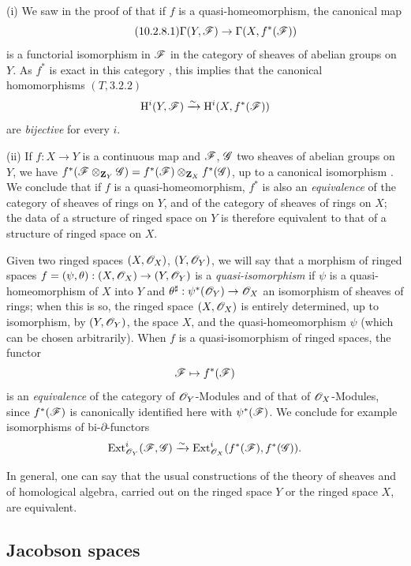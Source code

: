 \begin{remarks}[10.2.8]
\label{IV.10.2.8}
(i) We saw in the proof of  that if $f$ is a quasi-homeomorphism, the canonical map
\begin{equation}
\label{IV.10.2.8.1}
\tag{10.2.8.1}
\Gamma(Y,\mathscr{F})\to\Gamma(X,f^*(\mathscr{F}))
\end{equation}
is a functorial isomorphism in $\mathscr{F}$ in the category of sheaves of abelian groups on $Y$.
As $f^*$ is exact in this category , this implies that the canonical homomorphisms $(T,3.2.2)$
\[
  \mathrm{H}^i(Y,\mathscr{F})\xrightarrow{\sim}\mathrm{H}^i(X,f^*(\mathscr{F}))
\]
are \emph{bijective} for every $i$.

(ii) If $f:X\to Y$ is a continuous map and $\mathscr{F}$, $\mathscr{G}$ two sheaves of abelian groups on $Y$, we have $f^*(\mathscr{F}\otimes_{\mathbf{Z}_Y}\mathscr{G})=f^*(\mathscr{F})\otimes_{\mathbf{Z}_X}f^*(\mathscr{G})$, up to a canonical isomorphism .
We conclude that if $f$ is a quasi-homeomorphism, $f^*$ is also an \emph{equivalence} of the category of sheaves of rings on $Y$, and of the category of sheaves of rings on $X$; the data of a structure of ringed space on $Y$ is therefore equivalent to that of a structure of ringed space on $X$.

Given two ringed spaces $(X,\mathscr{O}_X)$, $(Y,\mathscr{O}_Y)$, we will say that a morphism of ringed spaces $f=(\psi,\theta):(X,\mathscr{O}_X)\to(Y,\mathscr{O}_Y)$ is a \emph{quasi-isomorphism} if $\psi$ is a quasi-homeomorphism of $X$ into $Y$ and $\theta^\sharp:\psi^*(\mathscr{O}_Y)\to\mathscr{O}_X$ an isomorphism of sheaves of rings; when this is so, the ringed space $(X,\mathscr{O}_X)$ is entirely determined, up to isomorphism, by $(Y,\mathscr{O}_Y)$, the space $X$, and the quasi-homeomorphism $\psi$ (which can be chosen arbitrarily).
When $f$ is a quasi-isomorphism of ringed spaces, the functor
\[
  \mathscr{F}\mapsto f^*(\mathscr{F})
\]
is an \emph{equivalence} of the category of $\mathscr{O}_Y$-Modules and of that of $\mathscr{O}_X$-Modules, since $f^*(\mathscr{F})$ is canonically identified here with $\psi^*(\mathscr{F})$.
We conclude for example isomorphisms of bi-$\partial$-functors
\[
  \operatorname{Ext}^i_{\mathscr{O}_Y}(\mathscr{F},\mathscr{G})\xrightarrow{\sim}\operatorname{Ext}^i_{\mathscr{O}_X}(f^*(\mathscr{F}),f^*(\mathscr{G})).
\]

In general, one can say that the usual constructions of the theory of sheaves and of homological algebra, carried out on the ringed space $Y$ or the ringed space $X$, are equivalent.
\end{remarks}

\subsection{Jacobson spaces}
\label{subsection:IV.10.3}

